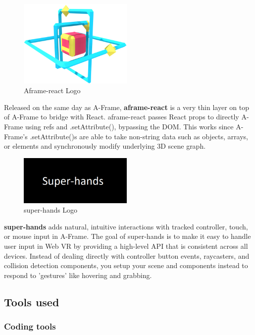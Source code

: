 \documentclass[]{report}
\begin{document}
\begin{figure}
	
	\includegraphics[width=5.5cm]{Aframe-react}
	\caption{Aframe-react Logo}
\end{figure}
Released on the same day as A-Frame, \textbf{aframe-react} is a very thin layer on top of A-Frame to bridge with React. aframe-react passes React props to directly A-Frame using refs and .setAttribute(), bypassing the DOM. This works since A-Frame's .setAttribute()s are able to take non-string data such as objects, arrays, or elements and synchronously modify underlying 3D scene graph.\\ \par
\begin{figure}
	
	\includegraphics[width=5.5cm]{super-hands}
	\caption{super-hands Logo}
\end{figure}
\textbf{super-hands} adds natural, intuitive interactions with tracked controller, touch, or mouse input in A-Frame.
The goal of super-hands is to make it easy to handle user input in Web VR by providing a high-level API that is consistent across all devices. Instead of dealing directly with controller button events, raycasters, and collision detection components, you setup your scene and components instead to respond to 'gestures' like hovering and grabbing. \\ \par


\subsection{Tools used}
\subsubsection{Coding tools}
\end{document}
